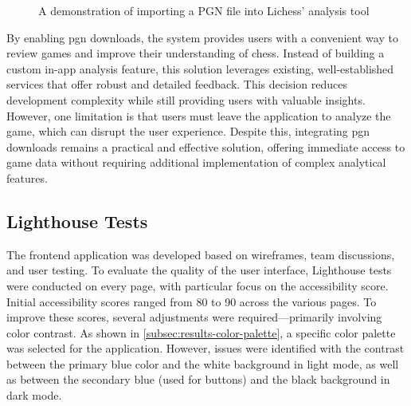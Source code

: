 \begin{figure}[h!] \centering {}\caption[Lichess analysis tool]{A demonstration of importing a PGN file into Lichess' analysis tool}\label{fig:downloaded-pgn-analysis} \end{figure}

By enabling \gls{pgn} downloads, the system provides users with a convenient way to review games and improve their understanding of chess. Instead of building a custom in-app analysis feature, this solution leverages existing, well-established services that offer robust and detailed feedback. This decision reduces development complexity while still providing users with valuable insights. \\

However, one limitation is that users must leave the application to analyze the game, which can disrupt the user experience. Despite this, integrating \gls{pgn} downloads remains a practical and effective solution, offering immediate access to game data without requiring additional implementation of complex analytical features.

\subsection{Lighthouse Tests}
The frontend application was developed based on wireframes, team discussions, and user testing. To evaluate the quality of the user interface, Lighthouse tests were conducted on every page, with particular focus on the accessibility score. \\

Initial accessibility scores ranged from 80 to 90 across the various pages. To improve these scores, several adjustments were required—primarily involving color contrast. As shown in \ref{subsec:results-color-palette}, a specific color palette was selected for the application. However, issues were identified with the contrast between the primary blue color and the white background in light mode, as well as between the secondary blue (used for buttons) and the black background in dark mode. \\

